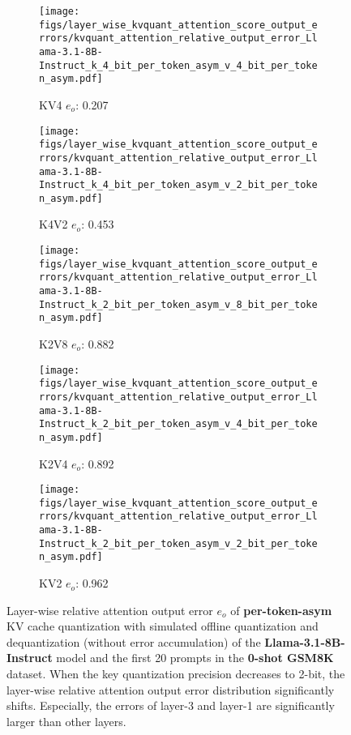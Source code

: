 \begin{figure*}
    \begin{subfigure}{0.25\textwidth}
    \texttt{[image: figs/layer\_wise\_kvquant\_attention\_score\_output\_errors/kvquant\_attention\_relative\_output\_error\_Llama-3.1-8B-Instruct\_k\_4\_bit\_per\_token\_asym\_v\_4\_bit\_per\_token\_asym.pdf]}
    \caption{KV4 $e_o$: 0.207 }
    \label{fig:full_kvcache_simulated_quant_error_layer_wise_k4v4_per_token_asym_Llama-3.1-8B-Instruct}
    \end{subfigure}
    \begin{subfigure}{0.25\textwidth}
    \texttt{[image: figs/layer\_wise\_kvquant\_attention\_score\_output\_errors/kvquant\_attention\_relative\_output\_error\_Llama-3.1-8B-Instruct\_k\_4\_bit\_per\_token\_asym\_v\_2\_bit\_per\_token\_asym.pdf]}
    \caption{K4V2 $e_o$: 0.453}
    \label{fig:full_kvcache_simulated_quant_error_layer_wise_k4v2_per_token_asym_Llama-3.1-8B-Instruct}
    \end{subfigure}
    \begin{subfigure}{0.25\textwidth}
    \texttt{[image: figs/layer\_wise\_kvquant\_attention\_score\_output\_errors/kvquant\_attention\_relative\_output\_error\_Llama-3.1-8B-Instruct\_k\_2\_bit\_per\_token\_asym\_v\_8\_bit\_per\_token\_asym.pdf]}
    \caption{K2V8 $e_o$: 0.882}
    \label{fig:full_kvcache_simulated_quant_error_layer_wise_k2v8_per_token_asym_Llama-3.1-8B-Instruct}
    \end{subfigure}
    \begin{subfigure}{0.25\textwidth}
    \texttt{[image: figs/layer\_wise\_kvquant\_attention\_score\_output\_errors/kvquant\_attention\_relative\_output\_error\_Llama-3.1-8B-Instruct\_k\_2\_bit\_per\_token\_asym\_v\_4\_bit\_per\_token\_asym.pdf]}
    \caption{K2V4 $e_o$: 0.892 }
    \label{fig:full_kvcache_simulated_quant_error_layer_wise_k2v4_per_token_asym_Llama-3.1-8B-Instruct}
    \end{subfigure}
    \begin{subfigure}{0.25\textwidth}
    \texttt{[image: figs/layer\_wise\_kvquant\_attention\_score\_output\_errors/kvquant\_attention\_relative\_output\_error\_Llama-3.1-8B-Instruct\_k\_2\_bit\_per\_token\_asym\_v\_2\_bit\_per\_token\_asym.pdf]}
    \caption{KV2 $e_o$: 0.962}
    \label{fig:full_kvcache_simulated_quant_error_layer_wise_k2v2_per_token_asym_Llama-3.1-8B-Instruct}
    \end{subfigure}
    \caption{Layer-wise relative attention output error $e_o$ of \textbf{per-token-asym} KV cache quantization with simulated offline quantization and dequantization (without error accumulation) of the \textbf{Llama-3.1-8B-Instruct} model and the first 20 prompts in the \textbf{0-shot GSM8K} dataset. When the key quantization precision decreases to 2-bit, the layer-wise relative attention output error distribution significantly shifts. Especially, the errors of layer-3 and layer-1 are significantly larger than other layers.}
\label{fig:kvcache_simulated_quant_attention_output_relative_error_layer_wise_per_token_asym_llama3.1_8b}
\end{figure*}


